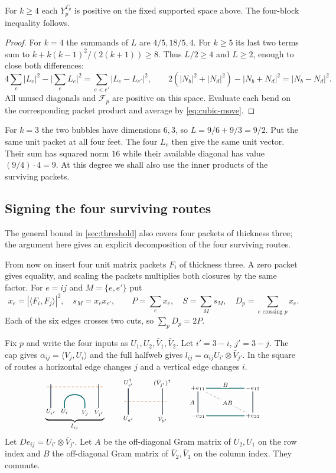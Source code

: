 \documentclass[a4paper,11pt]{amsart}
\numberwithin{equation}{subsection}
\theoremstyle{plain}
\theoremstyle{definition}
\newcommand{\CubRoute}{\begin{tikzpicture}[x=6.3mm,y=3.9mm,baseline=(current bounding box.center),
every node/.style={font=\scriptsize,inner sep=1pt},w/.style={draw=wiStrand,line width=.95pt}]
\draw[w](0,0)--(0,2.6) (3.25,0)--(3.25,2.6);
\draw[teal!80!black,line width=1pt](.93,0)--(.93,.55)to[out=90,in=90,looseness=1.4](2.31,.55)--(2.31,0);
\foreach \x/\t in {0/{U_{i'}},.93/{U_i},2.31/{\bar V_j},3.25/{\bar V_{j'}}}{\node[below]at(\x,0){$\t$};}
\draw[densely dashed,orange!70!black](-.27,2.31)--(3.52,2.31);
\end{tikzpicture}}
\newcommand{\CubSurvivors}{\begin{tikzpicture}[x=5mm,y=3.9mm,baseline=(current bounding box.center),
every node/.style={font=\scriptsize,inner sep=1.3pt},w/.style={draw=wiStrand,line width=.95pt}]
\draw[w](0,0)--(0,2.9) (2.9,0)--(2.9,2.9);
\draw[densely dashed,orange!70!black](-.35,1.45)--(3.25,1.45);
\node[below]at(0,0){$U_{a'}$};\node[below]at(2.9,0){$\bar V_{b'}$};
\node[above]at(0,2.9){$U_{i'}^\dagger$};\node[above]at(2.9,2.9){$(\bar V_{j'})^\dagger$};
\end{tikzpicture}}
\newcommand{\FigCubicSurvivorsGluing}{%
\begin{tikzpicture}[x=9mm,y=6.4mm,baseline=(current bounding box.center),
every node/.style={inner sep=1.3pt,font=\scriptsize},w/.style={draw=wiStrand,line width=.85pt},
cubExchange/.style={draw=teal!75!black,line width=.95pt},lab/.style={fill=white}]
\draw[w](0,0)--(0,1.85) (2.6,0)--(2.6,1.85);
\draw[cubExchange](0,0)--(2.6,0) (0,1.85)--(2.6,1.85);
\draw[black!55,densely dashed](.22,1.7)--(2.38,.15);
\node[lab,left]at(-.1,.9){$A$};\node[lab,above]at(1.3,1.85){$B$};
\node[lab]at(1.4,.87){$AB$};
\foreach \x/\y/\l in {0/1.85/{+e_{11}},2.6/1.85/{-e_{12}},0/0/{-e_{21}},2.6/0/{+e_{22}}}
\node[lab]at(\x,\y){$\l$};
\end{tikzpicture}%
}
\begin{document}
\begin{lemma}\label{cor:fourthick}
For $k\ge4$ each $Y_p^{\Gamma_p}$ is positive on the fixed supported space above. The four-block inequality follows.
\end{lemma}

\begin{proof}
For $k=4$ the summands of $L$ are $4/5,18/5,4$. For $k\ge5$ its last two terms sum to $k+k(k-1)^2/(2(k+1))\ge8$. Thus $L/2\ge4$ and $L\ge2$, enough to close both differences:
\[
4\sum_e|L_e|^2-\Big|\sum_eL_e\Big|^2=\sum_{e<e'}|L_e-L_{e'}|^2,
\qquad
2(|N_b|^2+|N_d|^2)-|N_b+N_d|^2=|N_b-N_d|^2.
\]
All unused diagonals and $\mathcal F_p$ are positive on this space. Evaluate each bend on the corresponding packet product and average by \autoref{eq:cubic-move}.
\end{proof}

\begin{example}
For $k=3$ the two bubbles have dimensions $6,3$, so $L=9/6+9/3=9/2$. Put the same unit packet at all four feet. The four $L_e$ then give the same unit vector. Their sum has squared norm $16$ while their available diagonal has value $(9/4)\cdot4=9$. At this degree we shall also use the inner products of the surviving packets.
\end{example}

\subsection{Signing the four surviving routes}

The general bound in \autoref{sec:threshold} also covers four
packets of thickness three; the argument here gives an explicit
decomposition of the four surviving routes.

From now on insert four unit matrix packets $F_i$ of thickness three. A zero packet gives equality, and scaling the packets multiplies both closures by the same factor. For $e=ij$ and $M=\{e,e'\}$ put
\[
x_e=|\langle F_i,F_j\rangle|^2,\quad s_M=x_e x_{e'},\qquad
P=\sum_e x_e,\quad S=\sum_Ms_M,\quad D_p=\sum_{e\text{ crossing }p}x_e .
\]
Each of the six edges crosses two cuts, so $\sum_pD_p=2P$.

Fix $p$ and write the four inputs as $U_1,U_2,\bar V_1,\bar V_2$. Let $i'=3-i$, $j'=3-j$. The cap gives $\alpha_{ij}=\langle V_j,U_i\rangle$ and the full halfweb gives $l_{ij}=\alpha_{ij}U_{i'}\otimes\bar V_{j'}$. In the square of routes a horizontal edge changes $j$ and a vertical edge changes $i$.
\[
\underbrace{\CubRoute}_{l_{ij}}\qquad
\CubSurvivors\qquad
\FigCubicSurvivorsGluing
\]
Let $D e_{ij}=U_{i'}\otimes\bar V_{j'}$. Let $A$ be the off-diagonal Gram matrix of $U_2,U_1$ on the row index and $B$ the off-diagonal Gram matrix of $\bar V_2,\bar V_1$ on the column index. They commute.
\end{document}
